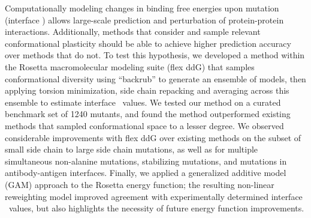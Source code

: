 Computationally modeling changes in binding free energies upon mutation (interface \ddg) allows large-scale prediction and perturbation of protein-protein interactions.
Additionally, methods that consider and sample relevant conformational plasticity should be able to achieve higher prediction accuracy over methods that do not.
To test this hypothesis, we developed a method within the Rosetta macromolecular modeling suite (flex ddG) that samples conformational diversity using ``backrub'' to generate an ensemble of models, then applying torsion minimization, side chain repacking and averaging across this ensemble to estimate interface \ddg\ values.
We tested our method on a curated benchmark set of 1240 mutants, and found the method outperformed existing methods that sampled conformational space to a lesser degree.
We observed considerable improvements with flex ddG over existing methods on the subset of small side chain to large side chain mutations, as well as for multiple simultaneous non-alanine mutations, stabilizing mutations, and mutations in antibody-antigen interfaces.
Finally, we applied a generalized additive model (GAM) approach to the Rosetta energy function; the resulting non-linear reweighting model improved agreement with experimentally determined interface \ddg\ values, but also highlights the necessity of future energy function improvements.
